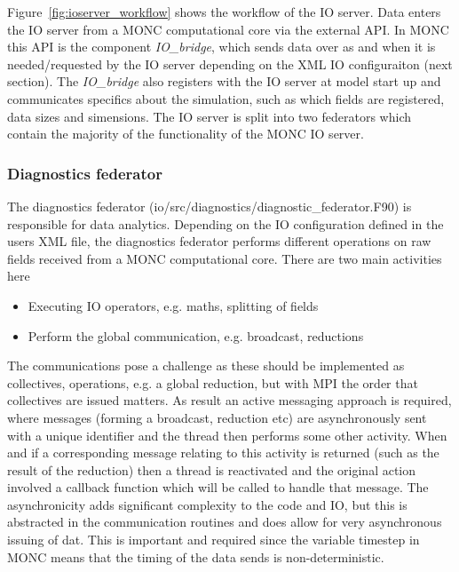 \documentclass[a4paper,11pt]{article}
\begin{document}
Figure~\ref{fig:ioserver_workflow} shows the workflow of the IO server.
Data enters the IO server from a MONC computational core via the external API. In
MONC this API is the component \emph{IO\_bridge}, which sends data over as and
when it is needed/requested by the IO server depending on the XML IO configuraiton
(next section). The \emph{IO\_bridge} also registers with the IO server at model
start up and communicates specifics about the simulation, such as which fields
are registered, data sizes and simensions. The IO server is split into
two federators which contain the majority of the functionality of the MONC IO
server.

\subsubsection{Diagnostics federator}

The diagnostics federator (io/src/diagnostics/diagnostic\_federator.F90) is
responsible for data analytics. Depending on the IO configuration
defined in the users XML file, the diagnostics federator performs different
operations on raw fields received from a MONC computational core.
There are two main activities here
\begin{itemize}
  \item {Executing IO operators, e.g. maths, splitting of fields}
  \item {Perform the global communication, e.g. broadcast, reductions}
\end{itemize}
The communications pose a challenge as these should be implemented as collectives,
operations, e.g. a global reduction, but with MPI the order that collectives
are issued matters. As result an active messaging approach is required, where
messages (forming a broadcast, reduction etc) are asynchronously sent with a
unique identifier and the thread then performs some other activity. When and if
a corresponding message relating to this activity is returned (such as the result
of the reduction) then a thread is reactivated and the original action involved
a callback function which will be called to handle that message. The
asynchronicity adds significant complexity to the code and IO, but this is abstracted
in the communication routines and does allow for very
asynchronous issuing of dat. This is important and required
since the variable timestep in MONC means that the timing of the data sends
is non-deterministic.
\end{document}
